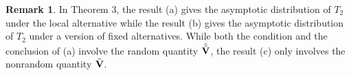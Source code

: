 \documentclass[times,sort&compress,3p]{elsarticle}
\theoremstyle{plain}
\theoremstyle{definition}
\newtheorem{remark}{\quad\quad Remark}
\theoremstyle{remark}
\begin{document}
\begin{remark}
    In Theorem 3, the result (a) gives the asymptotic distribution of $T_2$ under the local alternative while the result (b) gives the asymptotic distribution of $T_2$ under a version of fixed alternatives.
    While both the condition and the conclusion of (a) involve the random quantity $\hat{\tilde{\mathbf{V}}}$, the result (c) only involves the nonrandom quantity $\tilde{\mathbf{V}}$.
\end{remark}

\end{document}
